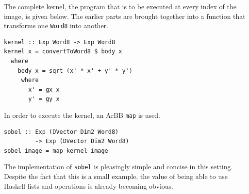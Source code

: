 The complete kernel, the program that is to be executed at every index of the image,
is given below. The earlier parts are brought together into a function that 
transforms one {\tt Word8} into another. 

\begin{verbatim} 
kernel :: Exp Word8 -> Exp Word8 
kernel x = convertToWord8 $ body x
  where 
    body x = sqrt (x' * x' + y' * y') 
     where 
       x' = gx x 
       y' = gy x
\end{verbatim}
\noindent
In order to execute the kernel, an ArBB {\tt map} is used. 

\begin{verbatim}
sobel :: Exp (DVector Dim2 Word8) 
         -> Exp (DVector Dim2 Word8) 
sobel image = map kernel image  
\end{verbatim} 


The implementation of {\tt sobel} is pleasingly simple and concise in this setting. 
Despite the fact that this is a small example, the value of being able to use Haskell
lists and operations is already becoming obvious.

